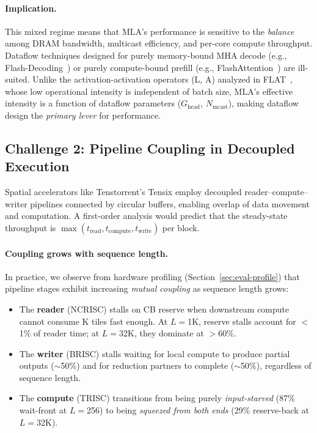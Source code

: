 \documentclass[sigconf, review, anonymous]{acmart}
\newcommand{\Ghead}{G_{\mathrm{head}}}
\begin{document}
\paragraph{Implication.}
This mixed regime means that MLA's performance is sensitive to the
\emph{balance} among DRAM bandwidth, multicast efficiency, and
per-core compute throughput.  Dataflow techniques designed for purely
memory-bound MHA decode (e.g., Flash-Decoding~\cite{flashdecoding2023})
or purely compute-bound prefill (e.g.,
FlashAttention~\cite{dao2022flashattention}) are ill-suited.
Unlike the activation-activation operators (L, A) analyzed in
FLAT~\cite{kao2023flat}, whose low operational intensity is
independent of batch size, MLA's effective intensity is a function of
dataflow parameters ($\Ghead$, $N_{\text{mcast}}$), making dataflow
design the \emph{primary lever} for performance.



\subsection{Challenge 2: Pipeline Coupling in Decoupled Execution}\label{sec:challenge-coupling}


Spatial accelerators like Tenstorrent's Tensix employ decoupled
reader--compute--writer pipelines connected by circular buffers,
enabling overlap of data movement and computation.  A first-order
analysis would predict that the steady-state throughput is
$\max(t_{\text{read}}, t_{\text{compute}}, t_{\text{write}})$ per block.

\paragraph{Coupling grows with sequence length.}
In practice, we observe from hardware profiling
(Section~\ref{sec:eval-profile}) that pipeline stages exhibit
increasing \emph{mutual coupling} as sequence length grows:
\begin{itemize}
  \item The \textbf{reader} (NCRISC) stalls on CB reserve when
    downstream compute cannot consume K tiles fast enough.  At
    $L{=}$1K, reserve stalls account for $<$1\% of reader time;
    at $L{=}$32K, they dominate at $>$60\%.
  \item The \textbf{writer} (BRISC) stalls waiting for local compute
    to produce partial outputs ($\sim$50\%) and for reduction partners
    to complete ($\sim$50\%), regardless of sequence length.
  \item The \textbf{compute} (TRISC) transitions from being purely
    \emph{input-starved} (87\% wait-front at $L{=}$256) to being
    \emph{squeezed from both ends} (29\% reserve-back at $L{=}$32K).
\end{itemize}
\end{document}
